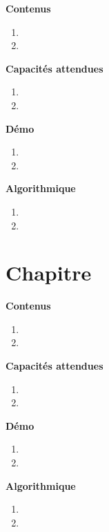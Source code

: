 \documentclass[10pt,a4paper]{article}
\begin{document}
\textbf{Contenus}

\begin{enumerate} 
\item 
\item 
\end{enumerate}


\textbf{Capacités attendues}

\begin{enumerate}
\item 
\item 
\end{enumerate}

\textbf{Démo}

\begin{enumerate}
\item 
\item 
\end{enumerate}

\textbf{Algorithmique}

\begin{enumerate}
\item 
\item 
\end{enumerate}

\section{Chapitre}

\textbf{Contenus}

\begin{enumerate} 
\item 
\item 
\end{enumerate}


\textbf{Capacités attendues}

\begin{enumerate}
\item 
\item 
\end{enumerate}

\textbf{Démo}

\begin{enumerate}
\item 
\item 
\end{enumerate}

\textbf{Algorithmique}

\begin{enumerate}
\item 
\item 
\end{enumerate}
\end{document}
